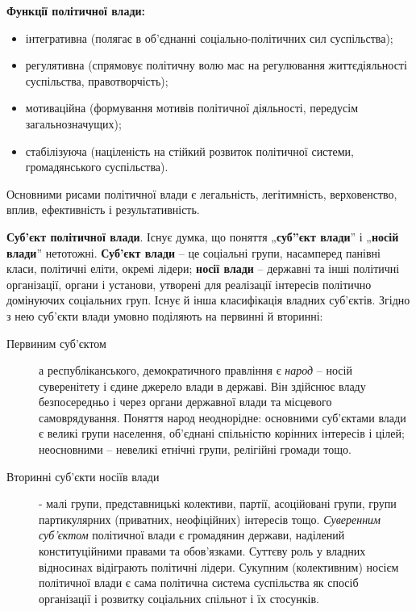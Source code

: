 \noindent\textbf{Функції політичної влади:}
\begin{itemize}
\item інтегративна (полягає в об'єднанні соціально-політичних сил суспільства);
\item регулятивна (спрямовує політичну волю мас на регулювання життєдіяльності суспільства, правотворчість);
\item мотиваційна (формування мотивів політичної діяльності, передусім загальнозначущих);
\item стабілізуюча (націленість на стійкий розвиток політичної системи, громадянського суспільства).
\end{itemize}
Основними рисами політичної влади є легальність, легітимність, верховенство, вплив, ефективність і результативність.

\textbf{Суб’єкт політичної влади}. Існує думка, що поняття „\textbf{суб”єкт влади}” і „\textbf{носій влади}” нетотожні. \textbf{Суб’єкт влади} – це соціальні групи, насамперед панівні класи, політичні еліти, окремі лідери; \textbf{носії влади	} – державні та інші політичні організації, органи і установи, утворені для реалізації інтересів політично домінуючих соціальних груп. Існує й інша класифікація владних суб’єктів. Згідно з нею суб’єкти влади умовно поділяють на первинні й вторинні:
\begin{description}
\item[Первиним суб’єктом] а республіканського, демократичного правління є \textit{народ} – носій суверенітету і єдине джерело влади в державі. Він здійснює владу безпосередньо і через органи державної влади та місцевого самоврядування. Поняття народ неоднорідне: основними суб’єктами влади є великі групи населення, об’єднані спільністю корінних інтересів і цілей; неосновними – невеликі етнічні групи, релігійні громади тощо.
\item[Вторинні суб’єкти носіїв влади] - малі групи, представницькі колективи, партії, асоційовані групи, групи партикулярних (приватних, неофіційних) інтересів тощо. \textit{Суверенним суб’єктом} політичної влади є громадянин держави, наділений конституційними правами та обов’язками. Суттєву роль у владних відносинах відіграють політичні лідери. Сукупним (колективним) носієм політичної влади є сама політична система суспільства як спосіб організації і розвитку соціальних спільнот і їх стосунків.
\end{description}
